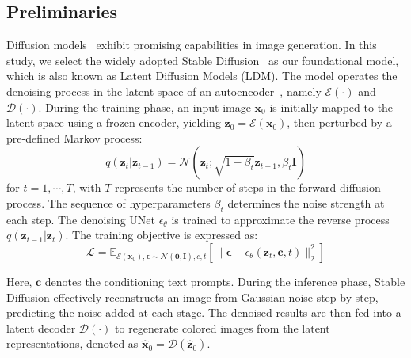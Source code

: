 \subsection{Preliminaries}
\label{subsec:preliminaries}

Diffusion models~\cite{ho2020ddpm} exhibit promising capabilities in image generation. In this study, we select the widely adopted Stable Diffusion~\cite{rombach2022ldm} as our foundational model, which is also known as Latent Diffusion Models (LDM). The model operates the denoising process in the latent space of an autoencoder~\cite{kingma2022ae}, namely $\mathcal{E}(\cdot)$ and $\mathcal{D}(\cdot)$. During the training phase, an input image $\bm{x}_{0}$ is initially mapped to the latent space using a frozen encoder, yielding $\bm{z}_{0}=\mathcal{E}(\bm{x}_{0})$, then perturbed by a pre-defined Markov process:
\begin{equation}
    q(\bm{z}_{t}|\bm{z}_{t-1})=\mathcal{N}(\bm{z}_{t}; \sqrt{1-\beta_{t}}\bm{z}_{t-1}, \beta_{t}\bm{I})
    \label{eq:img_diff}
\end{equation}
for $t=1,\cdots,T$, with $T$ represents the number of steps in the forward diffusion process. The sequence of hyperparameters $\beta_{t}$ determines the noise strength at each step. The denoising UNet $\epsilon_{\theta}$ is trained to approximate the reverse process $q(\bm{z}_{t-1}|\bm{z}_{t})$. The training objective is expressed as:
\begin{equation}
    \mathcal{L}=\mathbb{E}_{\mathcal{E}(\bm{x}_{0}),\bm{\epsilon}\sim\mathcal{N}(\bm{0}, \bm{I}), c, t}[\lVert \bm{\epsilon}-\epsilon_{\theta}(\bm{z}_{t},\bm{c},t) \rVert_{2}^{2}]
    \label{eq:img_diff_loss}
\end{equation}

Here, $\bm{c}$ denotes the conditioning text prompts. During the inference phase, Stable Diffusion effectively reconstructs an image from Gaussian noise step by step, predicting the noise added at each stage. The denoised results are then fed into a latent decoder $\mathcal{D}(\cdot)$ to regenerate colored images from the latent representations, denoted as $\hat{\bm{x}}_{0} = \mathcal{D}(\hat{\bm{z}}_{0})$.

